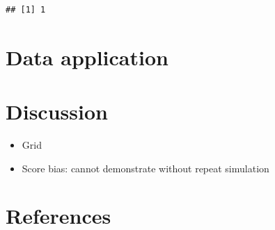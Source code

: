 \documentclass[
  11pt,
]{article}
\providecommand{\tightlist}{%
  \setlength{\itemsep}{0pt}\setlength{\parskip}{0pt}}
\begin{document}
\begin{verbatim}
## [1] 1
\end{verbatim}

\hypertarget{data-application}{%
\section{Data application}\label{data-application}}

\hypertarget{discussion}{%
\section{Discussion}\label{discussion}}

\begin{itemize}
\tightlist
\item
  Grid
\item
  Score bias: cannot demonstrate without repeat simulation
\end{itemize}

\hypertarget{references}{%
\section{References}\label{references}}
\end{document}
